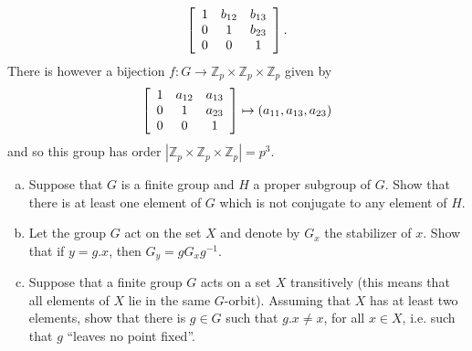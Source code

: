 \documentclass{article}
\newcounter{Problem}
\newenvironment{Problem}{\begin{Exercise}[name={Problem},
                                          counter={Problem}]}
                        {\end{Exercise}}
\begin{document}
\begin{Answer}
\begin{enumerate}[(a)]
{\begin{align*}
    \left[\begin{array}{c c c}
      1 & b_{12} & b_{13} \\
      0 & 1     & b_{23} \\
      0 & 0     & 1
    \end{array}\right].
    \end{align*}
    There is however a bijection
    $f : G \to \mathbb{Z}_p \times \mathbb{Z}_p \times \mathbb{Z}_p$
    given by
    $$
    \left[\begin{array}{c c c}
      1 & a_{12} & a_{13} \\
      0 & 1     & a_{23} \\
      0 & 0     & 1
    \end{array}\right]
    \mapsto
    (a_{11}, a_{13}, a_{23})
    $$
    and so this group has order
    $|\mathbb{Z}_p \times \mathbb{Z}_p \times \mathbb{Z}_p| = p^3$.
  }
\end{enumerate}
\end{Answer}

\pagebreak
\begin{Problem}
\begin{enumerate}[(a)]
  \item{Suppose that $G$ is a finite group and $H$ a proper subgroup
      of $G$. Show that there is at least one element of $G$ which is
      not conjugate to any element of $H$.}
  \item{Let the group $G$ act on the set $X$ and denote by $G_x$ the
      stabilizer of $x$. Show that if $y = g . x$, then $G_y = g
      G_x g^{-1}$.}
  \item{Suppose that a finite group $G$ acts on a set $X$ transitively
      (this means that all elements of $X$ lie in the same
      $G$-orbit). Assuming that $X$ has at least two elements, show
      that there is $g \in G$ such that $g . x \neq x$, for all $x
      \in X$,
      i.e. such that $g$ ``leaves no point fixed''.}
\end{enumerate}
\end{Problem}
\end{document}
